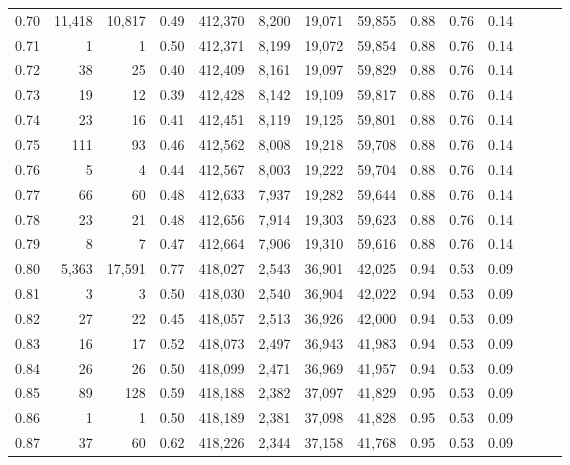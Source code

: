 \begin{tabular}{rrrrrrrrrrrrrr}
0.70 &  11,418 &  10,817 &  0.49 &  412,370 &    8,200 &  19,071 &  59,855 &  0.88 &  0.76 &      0.14 \\
0.71 &       1 &       1 &  0.50 &  412,371 &    8,199 &  19,072 &  59,854 &  0.88 &  0.76 &      0.14 \\
0.72 &      38 &      25 &  0.40 &  412,409 &    8,161 &  19,097 &  59,829 &  0.88 &  0.76 &      0.14 \\
0.73 &      19 &      12 &  0.39 &  412,428 &    8,142 &  19,109 &  59,817 &  0.88 &  0.76 &      0.14 \\
0.74 &      23 &      16 &  0.41 &  412,451 &    8,119 &  19,125 &  59,801 &  0.88 &  0.76 &      0.14 \\
0.75 &     111 &      93 &  0.46 &  412,562 &    8,008 &  19,218 &  59,708 &  0.88 &  0.76 &      0.14 \\
0.76 &       5 &       4 &  0.44 &  412,567 &    8,003 &  19,222 &  59,704 &  0.88 &  0.76 &      0.14 \\
0.77 &      66 &      60 &  0.48 &  412,633 &    7,937 &  19,282 &  59,644 &  0.88 &  0.76 &      0.14 \\
0.78 &      23 &      21 &  0.48 &  412,656 &    7,914 &  19,303 &  59,623 &  0.88 &  0.76 &      0.14 \\
0.79 &       8 &       7 &  0.47 &  412,664 &    7,906 &  19,310 &  59,616 &  0.88 &  0.76 &      0.14 \\
0.80 &   5,363 &  17,591 &  0.77 &  418,027 &    2,543 &  36,901 &  42,025 &  0.94 &  0.53 &      0.09 \\
0.81 &       3 &       3 &  0.50 &  418,030 &    2,540 &  36,904 &  42,022 &  0.94 &  0.53 &      0.09 \\
0.82 &      27 &      22 &  0.45 &  418,057 &    2,513 &  36,926 &  42,000 &  0.94 &  0.53 &      0.09 \\
0.83 &      16 &      17 &  0.52 &  418,073 &    2,497 &  36,943 &  41,983 &  0.94 &  0.53 &      0.09 \\
0.84 &      26 &      26 &  0.50 &  418,099 &    2,471 &  36,969 &  41,957 &  0.94 &  0.53 &      0.09 \\
0.85 &      89 &     128 &  0.59 &  418,188 &    2,382 &  37,097 &  41,829 &  0.95 &  0.53 &      0.09 \\
0.86 &       1 &       1 &  0.50 &  418,189 &    2,381 &  37,098 &  41,828 &  0.95 &  0.53 &      0.09 \\
0.87 &      37 &      60 &  0.62 &  418,226 &    2,344 &  37,158 &  41,768 &  0.95 &  0.53 &      0.09 \\

\end{tabular}
